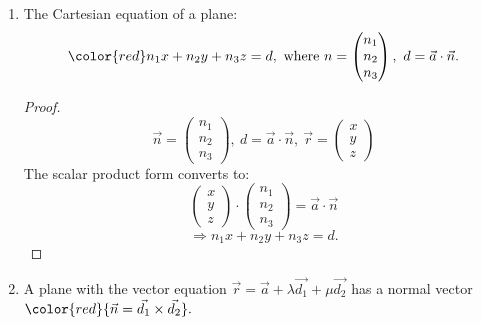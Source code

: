 \documentclass[12pt, a4paper]{article}
\newtheorem{theorem}{Theorem}[subsection]
\newtheorem{proof}{Proof}[subsection]
\begin{document}
\begin{enumerate}
\begin{itemize}
    \begin{theorem}
      $$\color{red} \overrightarrow{AR}\cdot\vec{n}=0\ \Rightarrow\ \left(\vec{r}-\vec{a}\right)\cdot\vec{n}=0$$
      $$\color{red} \therefore \vec{r}\cdot\vec{n}=\vec{a}\cdot\vec{n}$$
      where $\vec{a}$ is the position vector, and $\vec{n}$ is the normal vector. 
    \end{theorem}
  \end{itemize}
  \item The Cartesian equation of a plane: 
  $${\color{red}n_1x+n_2y+n_3z=d},\ \text{where }n=\begin{pmatrix}n_1\\n_2\\n_3\end{pmatrix},\ d=\vec{a}\cdot\vec{n}.$$
  \begin{proof}
    $$\vec{n}=\begin{pmatrix}n_1\\n_2\\n_3\end{pmatrix},\ d=\vec{a}\cdot\vec{n},\ \vec{r}=\begin{pmatrix}x\\y\\z\end{pmatrix}$$
    The scalar product form converts to: 
    $$\begin{pmatrix}x\\y\\z\end{pmatrix}\cdot\begin{pmatrix}n_1\\n_2\\n_3\end{pmatrix}=\vec{a}\cdot\vec{n}$$
    $$\Rightarrow n_1x+n_2y+n_3z=d.$$
  \end{proof}
  \item A plane with the vector equation $\vec{r}=\vec{a}+\lambda\vec{d_1}+\mu\vec{d_2}$ has a normal vector ${\color{red}{\vec{n}=\vec{d_1}\times\vec{d_2}}}.$
\end{enumerate}
\end{document}
